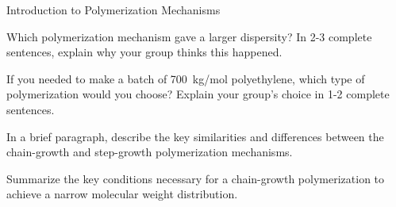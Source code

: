 \begin{activity}{Introduction to Polymerization Mechanisms}
\begin{ctqs}
		\begin{solution}[1.75in]
		\end{solution}
	
	\question Which polymerization mechanism gave a larger dispersity?  In 2-3 complete sentences, explain why your group thinks this happened.
	
		\begin{solution}[1.75in]
		\end{solution}
	
	\question If you needed to make a batch of 700~kg/mol polyethylene, which type of polymerization would you choose?  Explain your group's choice in 1-2 complete sentences.
	
		\begin{solution}[1.75in]
		\end{solution}
	
\end{ctqs}

\begin{exercises}

		\exercise In a brief paragraph, describe the key similarities and differences between the chain-growth and step-growth polymerization mechanisms.
		
		\exercise Summarize the key conditions necessary for a chain-growth polymerization to achieve a narrow molecular weight distribution.
			
\end{exercises}
	
\end{activity}
